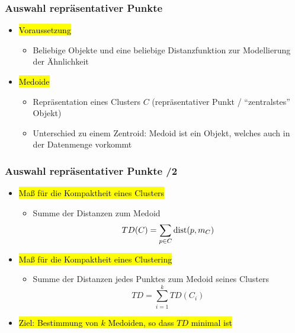 
\begin{frame}
\frametitle{Auswahl repräsentativer Punkte}

\begin{itemize}
\item\hl{Voraussetzung}
\begin{itemize}
\item Beliebige Objekte und eine beliebige Distanzfunktion zur
  Modellierung der Ähnlichkeit 
\end{itemize}
\item\hl{Medoide} 
\begin{itemize}
\item Repräsentation eines Clusters $C$ (repräsentativer Punkt /
 "`zentralstes"' Objekt)  
\item Unterschied zu einem Zentroid: Medoid ist ein Objekt, welches
  auch in der Datenmenge vorkommt 
\end{itemize}
\end{itemize}
\end{frame}


\begin{frame}

\frametitle{Auswahl repräsentativer Punkte /2}

\begin{itemize}
\item\hl{Maß für die Kompaktheit eines Clusters}
\begin{itemize}
\item Summe der Distanzen zum Medoid 
$$TD(C) = \sum_{p \in C} \operatorname{dist}(p, m_C)$$
\end{itemize}
\item\hl{Maß für die Kompaktheit eines Clustering} 
\begin{itemize}
\item Summe der Distanzen jedes Punktes zum Medoid seines Clusters 
$$TD=\sum_{i=1}^k TD(C_i)$$
\end{itemize}
\item\hl{Ziel: Bestimmung von $k$ Medoiden, so dass $TD$ minimal ist} 
\end{itemize}
\end{frame}


